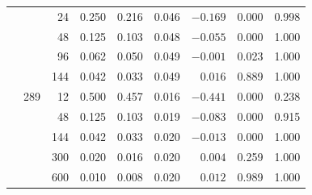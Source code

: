 \begin{table}[htbp]
\begin{tabular}{rrrrrrrrr}
 &  & 24 & 0.250 & 0.216 & 0.046 & $-0.169$ & 0.000 & 0.998 \\
 &  & 48 & 0.125 & 0.103 & 0.048 & $-0.055$ & 0.000 & 1.000 \\
 &  & 96 & 0.062 & 0.050 & 0.049 & $-0.001$ & 0.023 & 1.000 \\
 &  & 144 & 0.042 & 0.033 & 0.049 & $0.016$ & 0.889 & 1.000 \\
\addlinespace
0.02 & 289 & 12 & 0.500 & 0.457 & 0.016 & $-0.441$ & 0.000 & 0.238 \\
 &  & 48 & 0.125 & 0.103 & 0.019 & $-0.083$ & 0.000 & 0.915 \\
 &  & 144 & 0.042 & 0.033 & 0.020 & $-0.013$ & 0.000 & 1.000 \\
 &  & 300 & 0.020 & 0.016 & 0.020 & $0.004$ & 0.259 & 1.000 \\
 &  & 600 & 0.010 & 0.008 & 0.020 & $0.012$ & 0.989 & 1.000 \\
\bottomrule
\end{tabular}
\end{table}
